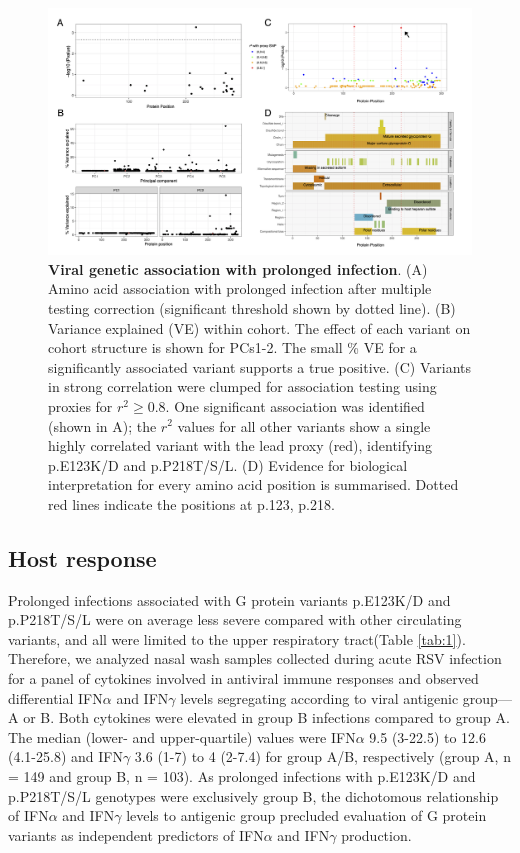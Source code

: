 \documentclass{article} %
\begin{document}
\begin{figure}[ht] \hspace{-1.5cm} 
    \includegraphics[scale=0.9]{f4}
	\caption{\textbf{Viral genetic association with prolonged infection}. (A) Amino acid association with prolonged infection after multiple testing correction (significant threshold shown by dotted line). (B) Variance explained (VE) within cohort. The effect of each variant on cohort structure is shown for PCs1-2. The small \% VE for a significantly associated variant supports a true positive. (C) Variants in strong correlation were clumped for association testing using proxies for $r^2 \ge 0.8$. One significant association was identified (shown in A); the $r^2$ values for all other variants show a single highly correlated variant with the lead proxy (red), identifying p.E123K/D and p.P218T/S/L.
	(D) Evidence for biological interpretation for every amino acid position is summarised. Dotted red lines indicate the positions at p.123, p.218.}
	\label{fig:3}
\end{figure}
\clearpage

\subsection{Host response}
Prolonged infections associated with G protein variants p.E123K/D and p.P218T/S/L were on average less severe compared with other circulating variants, and all were limited to the upper respiratory tract(Table \ref{tab:1}). 
Therefore, we analyzed nasal wash samples collected during acute RSV infection for a panel of cytokines involved in antiviral immune responses and observed differential IFN$\alpha$ and IFN$\gamma$ levels segregating according to viral antigenic group—A or B.
Both cytokines were elevated in group B infections compared to group A.
The median (lower- and upper-quartile) values were
IFN$\alpha$ 9.5 (3-22.5) to 12.6 (4.1-25.8) and 
IFN$\gamma$ 3.6 (1-7) to 4 (2-7.4) for group A/B, respectively (group A, n = 149 and group B, n = 103).
As prolonged infections with p.E123K/D and p.P218T/S/L genotypes were exclusively group B, 
the dichotomous relationship of IFN$\alpha$ and IFN$\gamma$ levels to antigenic group precluded evaluation of G protein variants as independent predictors of IFN$\alpha$ and IFN$\gamma$ production. 
\end{document}
